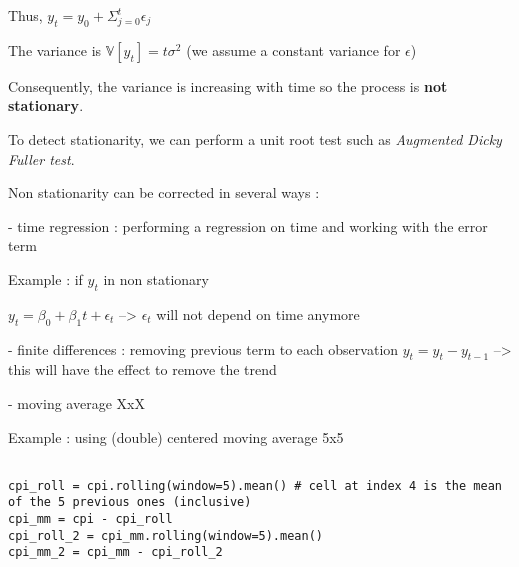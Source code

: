 Thus, $y_t = y_0 + \Sigma_{j=0}^t \epsilon_j$

The variance is $\mathbb{V}[y_t] = t \sigma^2$ (we assume a constant variance for $\epsilon$)

Consequently, the variance is increasing with time so the process is \textbf{not stationary}.

\vspace{5mm}

To detect stationarity, we can perform a unit root test such as \textit{Augmented Dicky Fuller test}.

\vspace{5mm}

Non stationarity can be corrected in several ways :

- time regression : performing a regression on time and working with the error term

Example : if $y_t$ in non stationary

$y_t = \beta_0 + \beta_1 t +\epsilon_t$ --> $\epsilon_t$ will not depend on time anymore

- finite differences : removing previous term to each observation $y_t = y_t - y_{t-1}$ --> this will have the effect to remove the trend

- moving average XxX

Example : using (double) centered moving average 5x5 

\lstset{language=Python}
\lstset{frame=lines}
\lstset{basicstyle=\footnotesize}
\begin{lstlisting}

cpi_roll = cpi.rolling(window=5).mean() # cell at index 4 is the mean of the 5 previous ones (inclusive)
cpi_mm = cpi - cpi_roll
cpi_roll_2 = cpi_mm.rolling(window=5).mean()
cpi_mm_2 = cpi_mm - cpi_roll_2

\end{lstlisting}

\vspace{5mm}